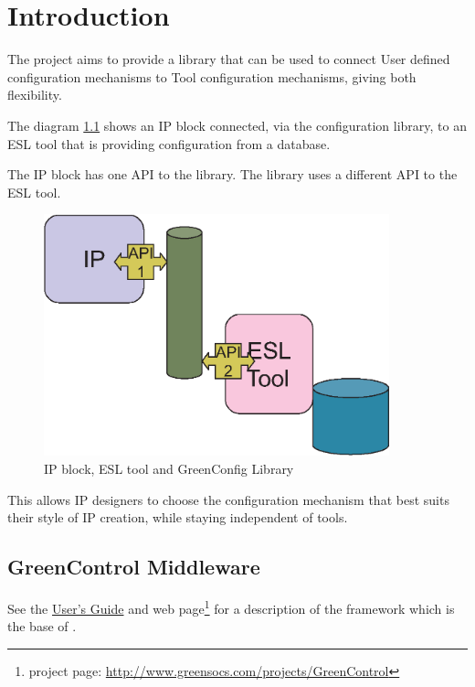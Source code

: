 
\cleardoublepage
\chapter{Introduction}

The \GreenConfig project aims to provide a library that can be used to connect User defined configuration mechanisms to Tool configuration mechanisms, giving both flexibility. 

The diagram \ref{fig:config} shows an IP block connected, via the configuration library, to an ESL tool that is providing configuration from a database. 

The IP block has one API to the library. The library uses a different API to the ESL tool. 

\begin{figure}[htbp]
	\centerline{
		\includegraphics[width=10cm]{config.eps}} 
	\caption{IP block, ESL tool and GreenConfig Library}
	\label{fig:config}
\end{figure}

This allows IP designers to choose the configuration mechanism that best suits their style of IP creation, while staying independent of tools.  

\section{GreenControl Middleware}
See the \hypertarget{GCUsersGuide}{\href{http://www.greensocs.com/projects/GreenControl/docs/GCUsersGuide}{\GreenControl User's Guide}} and web page\footnote{\GreenControl project page:  \href{http://www.greensocs.com/projects/GreenControl}{http://www.greensocs.com/projects/GreenControl}} for a description of the \GreenControl framework which is the base of \GreenConfig.

